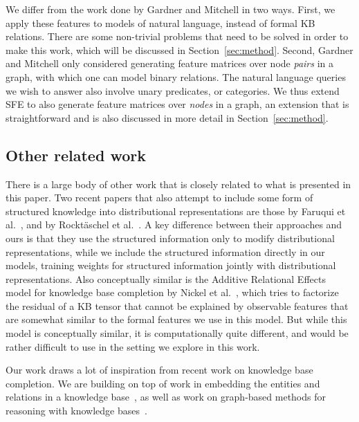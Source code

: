 \documentclass[11pt]{article}
\newcommand{\secref}[1]{Section~\ref{sec:#1}}
\begin{document}
We differ from the work done by Gardner and Mitchell in two ways.  First, we
apply these features to models of natural language, instead of formal KB
relations.  There are some non-trivial problems that need to be solved in order
to make this work, which will be discussed in \secref{method}.  Second, Gardner
and Mitchell only considered generating feature matrices over node \emph{pairs}
in a graph, with which one can model binary relations.  The natural language
queries we wish to answer also involve unary predicates, or categories.  We
thus extend SFE to also generate feature matrices over \emph{nodes} in a graph,
an extension that is straightforward and is also discussed in more detail in
\secref{method}.

\subsection{Other related work}

There is a large body of other work that is closely related to what is
presented in this paper.  Two recent papers that also attempt to include some
form of structured knowledge into distributional representations are those by
Faruqui et al.~, and by
Rockt\"{a}schel et al.~.  A key
difference between their approaches and ours is that they use the structured
information only to modify distributional representations, while we include the
structured information directly in our models, training weights for structured
information jointly with distributional representations.  Also conceptually
similar is the Additive Relational Effects model for knowledge base completion
by Nickel et al.~, which tries to factorize the
residual of a KB tensor that cannot be explained by observable features that
are somewhat similar to the formal features we use in this model.  But while
this model is conceptually similar, it is computationally quite different, and
would be rather difficult to use in the setting we explore in this work.

Our work draws a lot of inspiration from recent work on knowledge base
completion.  We are building on top of work in embedding the entities and
relations in a knowledge
base~\cite{riedel-2013-mf-universal-schema,nickel-2011-rescal,bordes-2013-transe},
as well as work on graph-based methods for reasoning with knowledge
bases~\cite{lao-2010-original-pra,gardner-2014-vector-space-pra,neelakantan-2015-rnn-kbc}.
\end{document}
